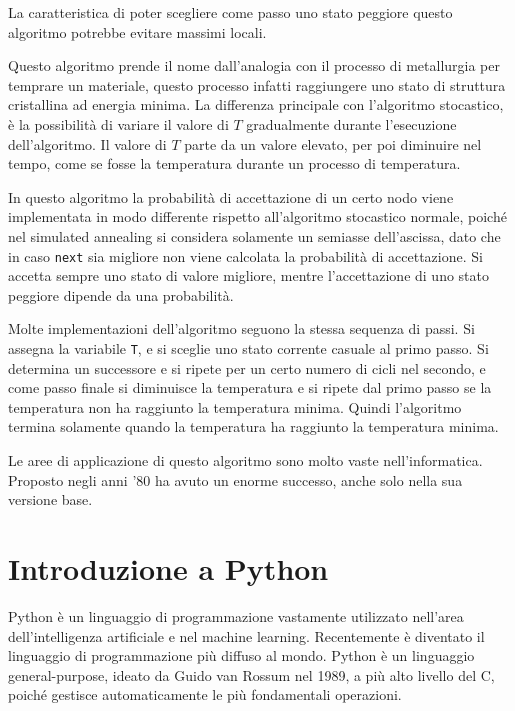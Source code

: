 \documentclass{article}
\numberwithin{equation}{subsection}
\begin{document}
La caratteristica di poter scegliere come passo uno stato peggiore questo algoritmo potrebbe evitare massimi locali. 


Questo algoritmo prende il nome dall'analogia con il processo di metallurgia per temprare un materiale, questo processo infatti raggiungere uno stato di struttura 
cristallina ad energia minima. La differenza principale con l'algoritmo stocastico, è la possibilità di variare il valore di $T$ gradualmente durante l'esecuzione 
dell'algoritmo. Il valore di $T$ parte da un valore elevato, per poi diminuire nel tempo, come se fosse la temperatura durante un processo di temperatura. 



In questo algoritmo la probabilità di accettazione di un certo nodo viene implementata in modo differente rispetto all'algoritmo stocastico normale, poiché nel simulated 
annealing si considera solamente un semiasse dell'ascissa, dato che in caso \verb|next| sia migliore non viene calcolata la probabilità di accettazione. Si accetta sempre 
uno stato di valore migliore, mentre l'accettazione di uno stato peggiore dipende da una probabilità. 


Molte implementazioni dell'algoritmo seguono la stessa sequenza di passi. Si assegna la variabile \verb|T|, e si sceglie uno stato corrente casuale al primo passo. Si determina 
un successore e si ripete per un certo numero di cicli nel secondo, e come passo finale si diminuisce la temperatura e si ripete dal primo passo se la temperatura non ha 
raggiunto la temperatura minima. Quindi l'algoritmo termina solamente quando la temperatura ha raggiunto la temperatura minima. 

Le aree di applicazione di questo algoritmo sono molto vaste nell'informatica. Proposto negli anni '80 ha avuto un enorme successo, anche solo nella sua versione base. 



\section{Introduzione a Python}

Python è un linguaggio di programmazione vastamente utilizzato nell'area dell'intelligenza artificiale e nel machine learning. Recentemente è diventato il linguaggio di 
programmazione più diffuso al mondo. Python è un linguaggio general-purpose, ideato da Guido van Rossum nel 1989, a più alto livello del C, poiché gestisce automaticamente le 
più fondamentali operazioni. 
\end{document}
